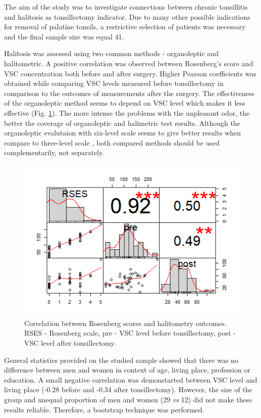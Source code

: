 \documentclass[12pt,a4paper,notitlepage]{report}
\begin{document}
The aim of the study was to investigate connections between chronic tonsillitis and halitosis as tonsillectomy indicator. 
Due to many other possible indications for removal of palatine tonsils, a restrictive selection of patients was necessary and the final sample size was equal 41.

Halitosis was assessed using two common methods - organoleptic and halitometric. A positive correlation was observed between Rosenberg's score and VSC concentration both before and after surgery. Higher Pearson coefficients was obtained while comparing VSC levels measured before tonsillectomy in comparison to the outcomes of measurements after the surgery. The effectiveness of the organoleptic method seems to depend on VSC level which makes it less effective (Fig. {\ref{fig:RSES_correlation}}). The more intense the problems with the unpleasant odor, the better the coverage of organoleptic and halimetric test results. Although the organoleptic evalutaion with six-level scale seems to give better results when compare to three-level scale \cite{MesquitaGuimaraes17}, both compared methods should be used complementarily, not separately.

\begin{figure}[h]
	\centering
	\includegraphics[width=0.7\columnwidth]{./Figures/RSES_correlation}
	\caption{Correlation between Rosenberg scores and halitometry outcomes. RSES - Rosenberg scale, pre - VSC level before tonsillectomy, post - VSC level after tonsillectomy.}
	\label{fig:RSES_correlation}
\end{figure}	

General statistics provided on the studied sample showed that there was no difference between men and women in context of age, living place, profession or education. A small negative correlation was demonstarted between VSC level and living place (-0.28 before and -0.34 after tonsillectomy). However, the size of the group and unequal proportion of men and women (29 \textit{vs} 12) did not make these results reliable. Therefore, a bootstrap technique was performed.
\end{document}
